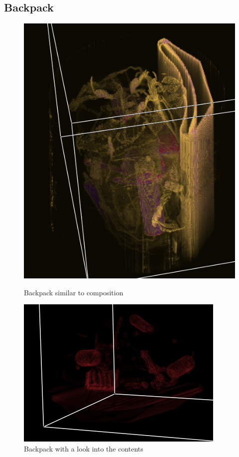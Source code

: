 \documentclass[a4paper,twoside,11pt]{article}
\begin{document}
 \subsection{Backpack}
  \begin{figure}[H]
 
  \includegraphics[width=\linewidth]{images/backpackOp}
  \caption{Backpack similar to composition}\label{toothOp}
\endminipage\hfill
{}
  \includegraphics[width=\linewidth]{images/backpackOp2}
  \caption{Backpack with a look into the contents}\label{toothOp2}
\endminipage\hfill
 \end{figure}
 
\end{document}
